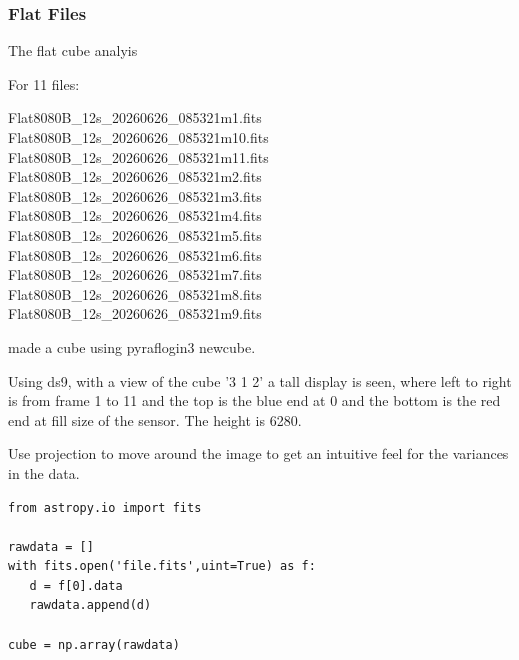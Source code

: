 \subsubsection{Flat Files}

The flat cube analyis

For 11 files:

    Flat8080B_12s_20260626_085321m1.fits
    Flat8080B_12s_20260626_085321m10.fits
    Flat8080B_12s_20260626_085321m11.fits
    Flat8080B_12s_20260626_085321m2.fits
    Flat8080B_12s_20260626_085321m3.fits
    Flat8080B_12s_20260626_085321m4.fits
    Flat8080B_12s_20260626_085321m5.fits
    Flat8080B_12s_20260626_085321m6.fits
    Flat8080B_12s_20260626_085321m7.fits
    Flat8080B_12s_20260626_085321m8.fits
    Flat8080B_12s_20260626_085321m9.fits

made a cube using pyraflogin3 newcube.

Using ds9, with a view of the cube '3 1 2'  a tall display is seen,
where left to right is from frame 1 to 11 and the top is the blue
end at 0 and the bottom is the red end at fill size of the sensor.
The height is 6280.

Use projection to move around the image to get an intuitive feel for the
variances in the data.



\begingroup \fontsize{10pt}{10pt}
\selectfont
\begin{verbatim} 
from astropy.io import fits

rawdata = []
with fits.open('file.fits',uint=True) as f:
   d = f[0].data
   rawdata.append(d)

cube = np.array(rawdata)
\end{verbatim}
\endgroup

